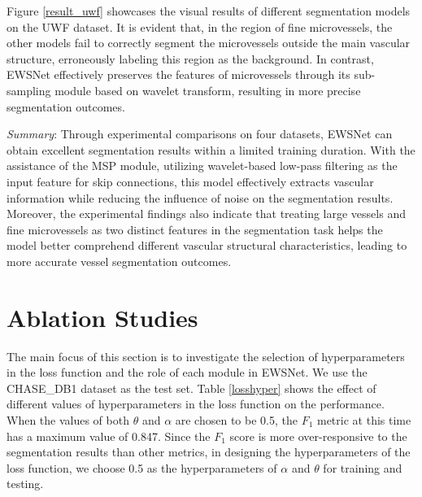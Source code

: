 \documentclass[a4paper,fleqn]{cas-dc}
\begin{document}
Figure \ref{result_uwf} showcases the visual results of different segmentation models on the UWF dataset. It is evident that, in the region of fine microvessels, the other models fail to correctly segment the microvessels outside the main vascular structure, erroneously labeling this region as the background. In contrast, EWSNet effectively preserves the features of microvessels through its sub-sampling module based on wavelet transform, resulting in more precise segmentation outcomes.



\textit{Summary}: Through experimental comparisons on four datasets, EWSNet can obtain excellent segmentation results within a limited training duration. With the assistance of the MSP module, utilizing wavelet-based low-pass filtering as the input feature for skip connections, this model effectively extracts vascular information while reducing the influence of noise on the segmentation results. Moreover, the experimental findings also indicate that treating large vessels and fine microvessels as two distinct features in the segmentation task helps the model better comprehend different vascular structural characteristics, leading to more accurate vessel segmentation outcomes.

\section{Ablation Studies}
The main focus of this section is to investigate the selection of hyperparameters in the loss function and the role of each module in EWSNet. We use the CHASE\_DB1 dataset as the test set. Table \ref{losshyper} shows the effect of different values of hyperparameters in the loss function on the performance. When the values of both $\theta$ and $\alpha$ are chosen to be 0.5, the $F_{1}$ metric at this time has a maximum value of 0.847. Since the $F_{1}$ score is more over-responsive to the segmentation results than other metrics, in designing the hyperparameters of the loss function, we choose 0.5 as the hyperparameters of $\alpha$ and $\theta$ for training and testing.
\end{document}
